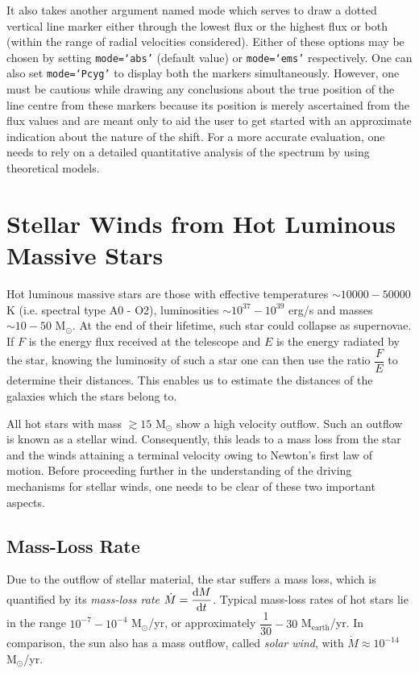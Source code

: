                 It also takes another argument named mode which serves to draw a dotted vertical line marker either through the lowest flux or the highest flux or both (within the range of radial velocities considered). Either of these options may be chosen by setting \texttt{mode=`abs'} (default value) or \texttt{mode=`ems'} respectively. One can also set \texttt{mode=`Pcyg'} to display both the markers simultaneously. However, one must be cautious while drawing any conclusions about the true position of the line centre from these markers because its position is merely ascertained from the flux values and are meant only to aid the user to get started with an approximate indication about the nature of the shift. For a more accurate evaluation, one needs to rely on a detailed quantitative analysis of the spectrum by using theoretical models.
    
    \section{Stellar Winds from Hot Luminous Massive Stars} \label{tool:stellar-winds}
        Hot luminous massive stars are those with effective temperatures $\sim 10000-50000$ K (i.e. spectral type A0 - O2), luminosities $\sim 10^{37}-10^{39}$ erg/s and masses $\sim 10-50$ M$_\odot$. At the end of their lifetime, such star could collapse as supernovae. If $F$ is the energy flux received at the telescope and $E$ is the energy radiated by the star, knowing the luminosity of such a star one can then use the ratio $\dfrac{F}{E}$ to determine their distances. This enables us to estimate the distances of the galaxies which the stars belong to.
        
        All hot stars with mass $\gtrsim 15$ M$_\odot$ show a high velocity outflow\cite{kudritzki2000winds}. Such an outflow is known as a stellar wind. Consequently, this leads to a mass loss from the star and the winds attaining a terminal velocity owing to Newton's first law of motion. Before proceeding further in the understanding of the driving mechanisms for stellar winds, one needs to be clear of these two important aspects.
        
        \subsection{Mass-Loss Rate} \label{tool:stellar-winds:mass-loss}
        	Due to the outflow of stellar material, the star suffers a mass loss, which is quantified by its \emph{mass-loss rate} $\dot{M}=\dfrac{\mathrm{d}M}{\mathrm{d}t}$. Typical mass-loss rates of hot stars lie in the range $10^{-7}-10^{-4}$ M$_\odot$/yr, or approximately $\dfrac{1}{30}-30$ M$_\text{earth}$/yr. In comparison, the sun also has a mass outflow, called \emph{solar wind}, with $\dot{M}\approx 10^{-14}$ M$_\odot$/yr.
        
